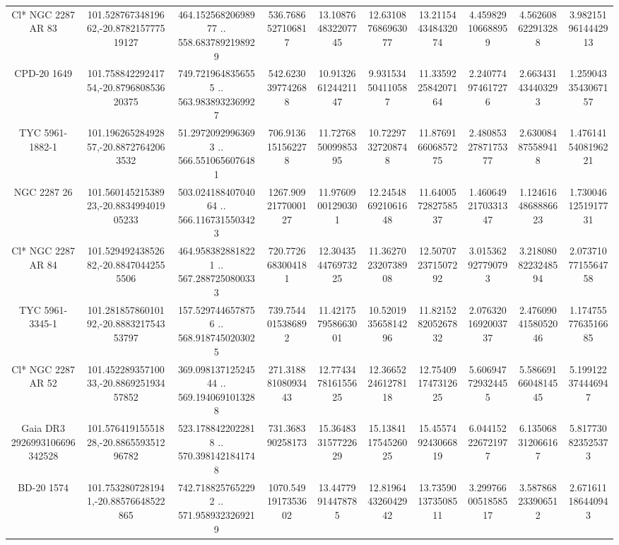 \begin{table}
\begin{tabular}{cccccccccc}
Cl* NGC 2287     AR      83 & 101.52876734819662,-20.878215777519127 & 464.15256820698977 .. 558.6837892198929 & 536.7686527106817 & 13.108764832207745 & 12.631087686963077 & 13.211544348432074 & 4.459829106688959 & 4.562608622913288 & 3.9821519614442913 \\
CPD-20  1649 & 101.75884229241754,-20.879680853620375 & 749.7219648356555 .. 563.9838932369927 & 542.6230397742688 & 10.913266124421147 & 9.931534504110587 & 11.335922584207164 & 2.240774974617276 & 2.663431434403293 & 1.2590433543067157 \\
TYC 5961-1882-1 & 101.19626528492857,-20.88727642063532 & 51.29720929963693 .. 566.5510656076481 & 706.9136151562278 & 11.727685009985395 & 10.72297327208748 & 11.876916606857275 & 2.4808532787175377 & 2.630084875589418 & 1.4761415408196221 \\
NGC  2287    26 & 101.56014521538923,-20.883499401905233 & 503.02418840704064 .. 566.1167315503423 & 1267.9092177000127 & 11.97609001290301 & 12.245486921061648 & 11.640057282758537 & 1.4606492170331347 & 1.1246164868886623 & 1.7300461251917731 \\
Cl* NGC 2287     AR      84 & 101.52949243852682,-20.88470442555506 & 464.9583828818221 .. 567.2887250800333 & 720.7726683004181 & 12.304354476973225 & 11.362702320738908 & 12.507072371507292 & 3.015362927790793 & 3.2180808223248594 & 2.0737107715564758 \\
TYC 5961-3345-1 & 101.28185786010192,-20.888321754353797 & 157.5297446578756 .. 568.9187450203025 & 739.7544015386892 & 11.421757958663001 & 10.520193565814296 & 11.821528205267832 & 2.0763201692003737 & 2.4760904158052046 & 1.1747557763516685 \\
Cl* NGC 2287     AR      52 & 101.45228935710033,-20.886925193457852 & 369.09813712524544 .. 569.1940691013288 & 271.31888108093443 & 12.774347816155625 & 12.366522461278118 & 12.754091747312625 & 5.606947729324455 & 5.5866916604814545 & 5.199122374446947 \\
Gaia DR3 2926993106696342528 & 101.57641915551828,-20.886559351296782 & 523.1788422022818 .. 570.3981421841748 & 731.368390258173 & 15.364833157722629 & 15.138411754526025 & 15.455749243066819 & 6.044152226721977 & 6.135068312066167 & 5.817730823525373 \\
BD-20  1574 & 101.7532807281941,-20.88576648522865 & 742.7188257652292 .. 571.9589323269219 & 1070.5491917353602 & 13.44779914478785 & 12.819644326042942 & 13.735901373508511 & 3.2997660051858517 & 3.587868233906512 & 2.671611186440943 \\

\end{tabular}
\end{table}
